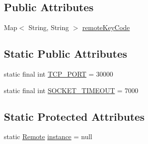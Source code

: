 \subsection*{\-Public \-Attributes}
\begin{DoxyCompactItemize}
\item 
\-Map$<$ \-String, \-String $>$ \hyperlink{classcom_1_1axcoto_1_1shinjuku_1_1maki_1_1_remote_a6bfdec8a6e2398841ac2cdf6bca33010}{remote\-Key\-Code}
\end{DoxyCompactItemize}
\subsection*{\-Static \-Public \-Attributes}
\begin{DoxyCompactItemize}
\item 
static final int \hyperlink{classcom_1_1axcoto_1_1shinjuku_1_1maki_1_1_remote_a68ddf0d3e72cbbd6d1d82820cefac66f}{\-T\-C\-P\-\_\-\-P\-O\-R\-T} = 30000
\item 
static final int \hyperlink{classcom_1_1axcoto_1_1shinjuku_1_1maki_1_1_remote_ac33d0d5b79125bd418f08fea3d829c4c}{\-S\-O\-C\-K\-E\-T\-\_\-\-T\-I\-M\-E\-O\-U\-T} = 7000
\end{DoxyCompactItemize}
\subsection*{\-Static \-Protected \-Attributes}
\begin{DoxyCompactItemize}
\item 
static \hyperlink{classcom_1_1axcoto_1_1shinjuku_1_1maki_1_1_remote}{\-Remote} \hyperlink{classcom_1_1axcoto_1_1shinjuku_1_1maki_1_1_remote_adff3b1d9933e14d47d585ef91fbc26e7}{instance} = null
\end{DoxyCompactItemize}
